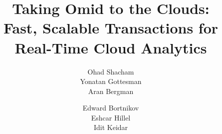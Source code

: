 \documentclass{vldb}
\begin{document}
\date{}

\title{Taking Omid to the Clouds: \\ Fast,  Scalable Transactions for Real-Time Cloud Analytics }

\author{
\alignauthor
Ohad Shacham\\
       \email{}
\alignauthor
Yonatan Gottesman\\ %
       \email{}
\alignauthor
Aran Bergman\\
       \email{}
\and
\alignauthor
Edward Bortnikov\\
       \email{} 
\alignauthor
Eshcar Hillel\\
       \email{}
\alignauthor
Idit Keidar\\
       \email{}
} %


\maketitle

\end{document}
